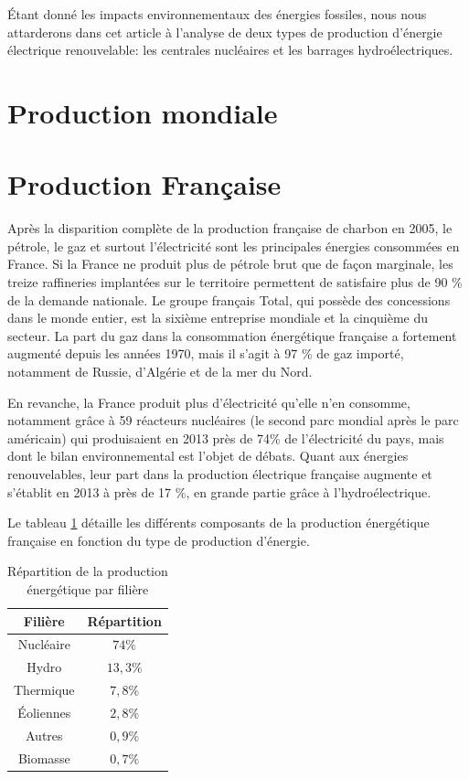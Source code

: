 \documentclass[12pt,a4paper,oneside,openany]{memoir}
\begin{document}
Étant donné les impacts environnementaux des énergies fossiles, nous nous attarderons dans cet article à l'analyse de deux types de production d'énergie électrique renouvelable: les centrales nucléaires et les barrages hydroélectriques. 

\section{Production mondiale}

\section{Production Française}

Après la disparition complète de la production française de charbon en 2005, le pétrole, le gaz et surtout l’électricité sont les principales énergies consommées en France. Si la France ne produit plus de pétrole brut que de façon marginale, les treize raffineries implantées sur le territoire permettent de satisfaire plus de 90 \% de la demande nationale. Le groupe français Total, qui possède des concessions dans le monde entier, est la sixième entreprise mondiale et la cinquième du secteur. La part du gaz dans la consommation énergétique française a fortement augmenté depuis les années 1970, mais il s’agit à 97 \% de gaz importé, notamment de Russie, d’Algérie et de la mer du Nord. 

En revanche, la France produit plus d’électricité qu’elle n’en consomme, notamment grâce à 59 réacteurs nucléaires (le second parc mondial après le parc américain) qui produisaient en 2013 près de 74\% de l’électricité du pays, mais dont le bilan environnemental est l’objet de débats. Quant aux énergies renouvelables, leur part dans la production électrique française augmente et s’établit en 2013 à près de 17 \%, en grande partie grâce à l’hydroélectrique. 

Le tableau \ref{repartition production} détaille les différents composants de la production énergétique française en fonction du type de production d'énergie.

	\begin{table}[h]
		\centering
		\begin{tabular}{cc}
			\toprule
			Filière & Répartition\\
			\midrule
			Nucléaire & $74\%$ \\ 
			Hydro & $13,3\%$ \\ 
			Thermique & $7,8\%$ \\ 
			Éoliennes & $2,8\%$ \\ 
			Autres & $0,9\%$ \\ 
			Biomasse & $0,7\%$ \\ 
			\bottomrule
		\end{tabular} 
		\caption{Répartition de la production énergétique par filière}
		\label{repartition production}
	\end{table}
\end{document}

